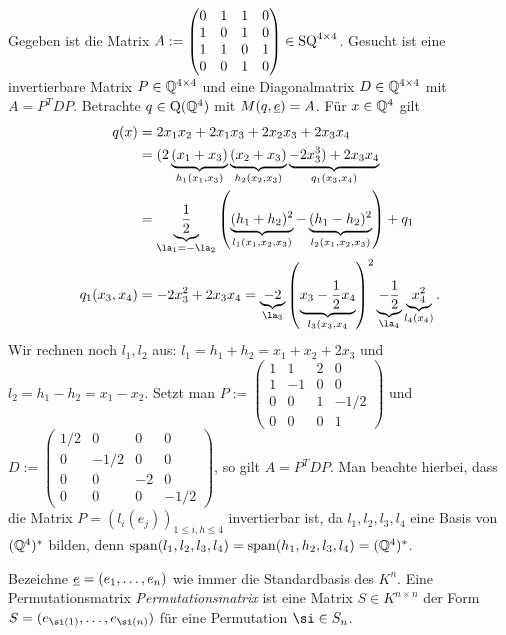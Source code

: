 \documentclass[../../main.tex]{subfiles}
\begin{document}
\begin{bsp}\label{13.5.4}
Gegeben ist die Matrix $A:=\begin{pmatrix}0&1&1&0\\1&0&1&0\\1&1&0&1\\0&0&1&0\end{pmatrix}\in \operatorname{SQ}^{4\times 4}$. Gesucht ist eine invertierbare Matrix $P\in \mathbb Q^{4\times 4}$ und eine Diagonalmatrix $D\in \mathbb Q^{4\times 4}$ mit $A=P^TDP$. Betrachte $q\in \operatorname{Q}(\mathbb Q^4)$ mit $M(q,{\underline e})=A$. Für $x\in \mathbb Q^4$ gilt
\begin{align*}
q(x)&=2x_1x_2+2x_1x_3+2x_2x_3+2x_3x_4\\
&=(2\underbrace{(x_1+x_3)}_{h_1(x_1,x_3)}\underbrace{(x_2+x_3)}_{h_2(x_2,x_3)}\underbrace{-2x_3^3)+2x_3x_4}_{q_1(x_3,x_4)}\\
&=\underbrace{\frac{1}{2}}_{\la_1=-\la_2}\left(\underbrace{(h_1+h_2)^2}_{l_1(x_1,x_2,x_3)}-\underbrace{(h_1-h_2)^2}_{l_2(x_1,x_2,x_3)}\right)+q_1\\
q_1(x_3,x_4)&=-2x_3^2+2x_3x_4=\underbrace{-2}_{\la_3}\left(\underbrace{x_3-\frac{1}{2}x_4}_{l_3(x_3,x_4}\right)^2\underbrace{-\frac{1}{2}}_{\la_4}\underbrace{x_4^2}_{l_4(x_4)}.
\end{align*}
Wir rechnen noch $l_1,l_2$ aus: $l_1=h_1+h_2=x_1+x_2+2x_3$ und $l_2=h_1-h_2=x_1-x_2$. Setzt man $P:=\begin{pmatrix*}1&1&2&0\\1&-1&0&0\\0&0&1&-1/2\\0&0&0&1\end{pmatrix*}$ und $D:=\begin{pmatrix*}1/2 & 0 & 0 & 0\\0&-1/2&0&0\\ 0&0&-2&0\\ 0&0&0&-1/2\end{pmatrix*}$, so gilt $A=P^TDP$. Man beachte hierbei, dass die Matrix $P=(l_i(e_j))_{1\le i,h\le 4}$ invertierbar ist, da $l_1,l_2,l_3,l_4$ eine Basis von $(\mathbb Q^4)^*$ bilden, denn $\operatorname{span}(l_1,l_2,l_3,l_4)=\operatorname{span}(h_1,h_2,l_3,l_4)=(\mathbb Q^4)^*$.
\end{bsp}

\begin{df}\label{13.5.5}
Bezeichne ${\underline e}=(e_1,\ldots ,e_n)$ wie immer die Standardbasis des $K^n$. Eine Permutationsmatrix \emph{Permutationsmatrix} ist eine Matrix $S\in K^{n\times n}$ der Form $S=(e_{\si(1)},\ldots ,e_{\si(n)})$ für eine Permutation $\si \in S_n$.
\end{df}
	
\end{document}
